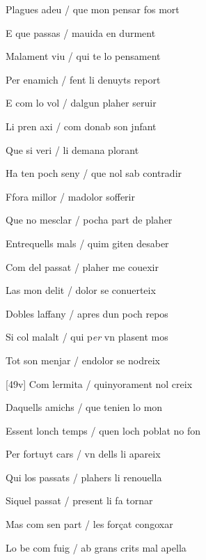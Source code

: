 \documentclass[12pt]{article}
\begin{document}
\begin{estrofa}

 Plagues adeu / que mon pensar fos mort

 E que passas / mauida en durment

 Malament viu / qui te lo pensament

 Per enamich / fent li denuyts report

 E com lo vol / dalgun plaher seruir

 Li pren axi / com donab son jnfant

 Que si veri / li demana plorant

 Ha ten poch seny / que nol sab contradir

\end{estrofa}



\begin{estrofa}

 Ffora millor / madolor sofferir

 Que no mesclar / pocha part de plaher

 Entrequells mals / quim giten desaber

 Com del passat / plaher me couexir

 Las mon delit / dolor se conuerteix

 Dobles laffany / apres dun poch repos

 Si col malalt / qui p\textit{er} vn plasent mos

 Tot son menjar / endolor se nodreix

\end{estrofa}



\begin{estrofa}

 [49v] Com lermita / quinyorament nol creix

 Daquells amichs / que tenien lo mon

 Essent lonch temps / quen loch poblat no fon

 Per fortuyt cars / vn dells li apareix

 Qui los passats / plahers li renouella

 Siquel passat / present li fa tornar

 Mas com sen part / les for\c{c}at congoxar

 Lo be com fuig / ab grans crits mal apella

\end{estrofa}
\end{document}
